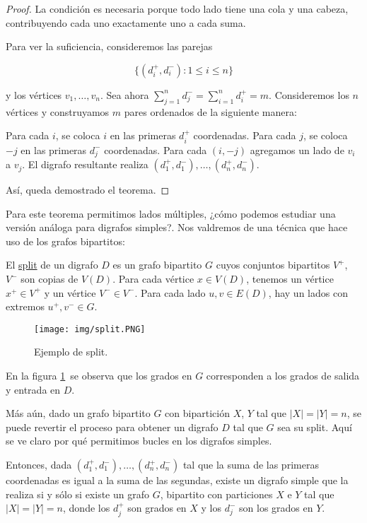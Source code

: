 \begin{proof}
    La condición es necesaria porque todo lado tiene una cola y una cabeza, contribuyendo cada uno exactamente uno a cada suma.
    
    Para ver la suficiencia, consideremos las parejas
    
    \[
    \{ (d_i^+, d_i^-) : 1 \leq i \leq n \}
    \]
    
    \noindent y los vértices $v_1, \dots, v_n$. Sea ahora $\sum_{j=1}^n d_j^- = \sum_{i=1}^n d_i^+ = m$. Consideremos los $n$ vértices y construyamos $m$ pares ordenados de la siguiente manera:
    
    Para cada $i$, se coloca $i$ en las primeras $d_i^+$ coordenadas. Para cada $j$, se coloca $-j$ en las primeras $d_j^-$ coordenadas. Para cada $(i,-j)$ agregamos un lado de $v_i$ a $v_j$. El digrafo resultante realiza $(d_1^+, d_1^-), \dots, (d_n^+, d_n^-)$.
    
    Así, queda demostrado el teorema.
\end{proof}

Para este teorema permitimos lados múltiples, ¿cómo podemos estudiar una versión análoga para digrafos simples?. Nos valdremos de una técnica que hace uso de los grafos bipartitos:

\begin{defn}
    El \ul{split} de un digrafo $D$ es un grafo bipartito $G$ cuyos conjuntos bipartitos $V^+$, $V^-$ son copias de $V(D)$. Para cada vértice $x \in V(D)$, tenemos un vértice $x^+ \in V^+$ y un vértice $V^- \in V^-$. Para cada lado $u,v \in E(D)$, hay un lados con extremos $u^+, v^- \in G$.
\end{defn}

\begin{figure}
    \centering
    \texttt{[image: img/split.PNG]}
    \caption{Ejemplo de split.}
    \label{fig:split}
\end{figure}

En la figura \ref{fig:split}~se observa que los grados en $G$ corresponden a los grados de salida y entrada en $D$.

Más aún, dado un grafo bipartito $G$ con bipartición $X$, $Y$ tal que $|X| = |Y| = n$, se puede revertir el proceso para obtener un digrafo $D$ tal que $G$ sea su split. Aquí se ve claro por qué permitimos bucles en los digrafos simples.

Entonces, dada $(d_1^+,d_1^-), \dots, (d_n^+,d_n^-)$ tal que la suma de las primeras coordenadas es igual a la suma de las segundas, existe un digrafo simple que la realiza si y sólo si existe un grafo $G$, bipartito con particiones $X$ e $Y$ tal que $|X| = |Y| = n$, donde los $d_j^+$ son grados en $X$ y los $d_j^-$ son los grados en $Y$.

